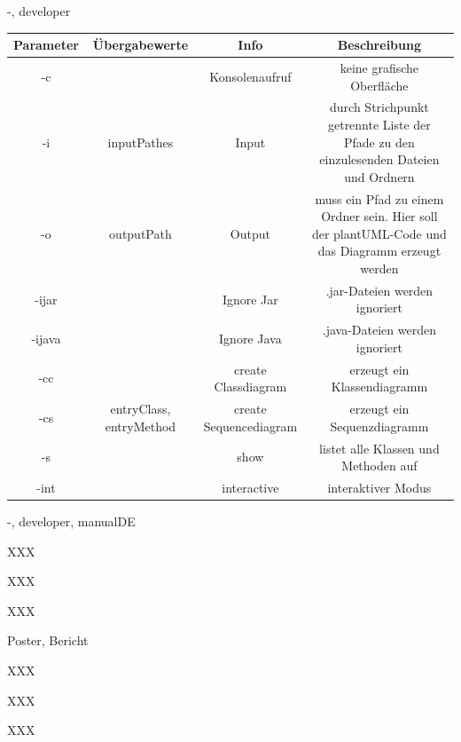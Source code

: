 \documentclass[twoside]{report}
\begin{document}
\begin{shownto}{-, developer}
\begin{tabular}{|c|c|c|c|}
\hline 
Parameter & Übergabewerte & Info & Beschreibung \\ 
\hline 
-c & & Konsolenaufruf & keine grafische Oberfläche \\ 
\hline 
-i & inputPathes & Input & durch Strichpunkt getrennte Liste der Pfade zu den einzulesenden Dateien und Ordnern \\ 
\hline 
-o & outputPath & Output & muss ein Pfad zu einem Ordner sein. Hier soll der plantUML-Code und das Diagramm erzeugt werden \\ 
\hline 
-ijar & & Ignore Jar & .jar-Dateien werden ignoriert \\ 
\hline 
-ijava & & Ignore Java & .java-Dateien werden ignoriert \\ 
\hline 
-cc & & create Classdiagram & erzeugt ein Klassendiagramm \\ 
\hline
-cs & entryClass, entryMethod & create Sequencediagram & erzeugt ein Sequenzdiagramm \\
-s & & show & listet alle Klassen und Methoden auf \\
-int & & interactive & interaktiver Modus \\
\hline 
\end{tabular} 


\nsecend
\end{shownto} %
\begin{shownto}{-, developer, manualDE}
\nsecend

XXX
\nsecend

XXX
\nsecend

\nsecend %



XXX
\nsecend

Poster, Bericht
\nsecend

XXX
\nsecend

XXX
\nsecend

XXX
\nsecend


\nsecend %

\nsecdocumentend

\end{shownto} %
\end{document}
